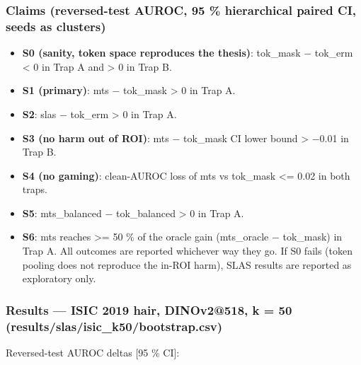 {\subsubsection{Claims (reversed-test AUROC, 95 \% hierarchical paired CI, seeds as clusters)}\label{claims-reversed-test-auroc-95--hierarchical-paired-ci-seeds-as-clusters}

\begin{itemize}

\item
  \textbf{S0 (sanity, token space reproduces the thesis)}: tok\_mask − tok\_erm \textless{} 0 in Trap A and \textgreater{} 0 in Trap B.
\item
  \textbf{S1 (primary)}: mts − tok\_mask \textgreater{} 0 in Trap A.
\item
  \textbf{S2}: slas − tok\_erm \textgreater{} 0 in Trap A.
\item
  \textbf{S3 (no harm out of ROI)}: mts − tok\_mask CI lower bound \textgreater{} −0.01 in Trap B.
\item
  \textbf{S4 (no gaming)}: clean-AUROC loss of mts vs tok\_mask \textless= 0.02 in both traps.
\item
  \textbf{S5}: mts\_balanced − tok\_balanced \textgreater{} 0 in Trap A.
\item
  \textbf{S6}: mts reaches \textgreater= 50 \% of the oracle gain (mts\_oracle − tok\_mask) in Trap A.
  All outcomes are reported whichever way they go. If S0 fails (token pooling does not reproduce the in-ROI
  harm), SLAS results are reported as exploratory only.
\end{itemize}

\subsubsection{Results --- ISIC 2019 hair, DINOv2@518, k = 50 (results/slas/isic\_k50/bootstrap.csv)}\label{results--isic-2019-hair-dinov2518-k--50-resultsslasisic_k50bootstrapcsv}

Reversed-test AUROC deltas {[}95 \% CI{]}:

\begin{itemize}


\end{itemize}}
